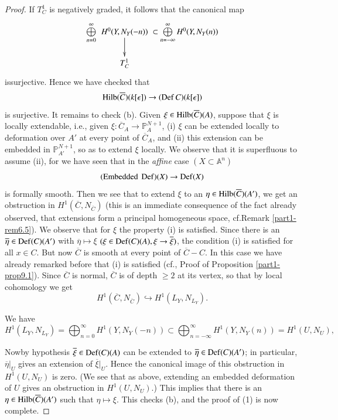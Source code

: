 {\begin{proof}
If $T^{1}_{C}$ is negatively graded, it follows that the canonical map
\[
\xymatrix@C=.0cm@R=.5cm{
\bigoplus\limits^{\infty}_{n=0} & H^{0}(Y,N_{Y}(-n))\ar[d] & \subset
\bigoplus\limits^{\infty}_{n=-\infty}H^{0}(Y,N_{Y}(n))\\
& T^{1}_{C} &
}
\]
is\pageoriginale surjective. Hence we have checked that
$$
\operatorname{Hilb}(\overline{C})(k[\epsilon])\to (\operatorname{Def} C)(k[\epsilon])
$$
is surjective. It remains to check (b). Given $\xi\in
\operatorname{Hilb}(\overline{C})(A)$, suppose that $\xi$ is locally extendable,
i.e., given $\xi:\overline{C}_{A}\to \mathbb{P}^{N+1}_{A}$, (i) $\xi$
can be extended locally to deformation over $A'$ at every point of
$\overline{C}_{A}$, and (ii) this extension can be embedded in
$\mathbb{P}^{N+1}_{A'}$, so as to extend $\xi$ locally. We observe
that it is superfluous to assume (ii), for we have seen that in the
{\em affine} case $(X\subset \mathbb{A}^{n})$
$$
(\text{Embedded~}\operatorname{Def})(X)\to \operatorname{Def}(X)
$$
is formally smooth. Then we see that to extend $\xi$ to an $\eta\in
\operatorname{Hilb}(\overline{C})(A')$, we get an obstruction in
$H^{1}(\overline{C},N_{\overline{C}})$ (this is an immediate
consequence of the fact already observed, that extensions form a
principal homogeneous space, cf.\@ Remark \ref{part1-rem6.5}). We
observe that for $\xi$ the property (i) is satisfied. Since there is
an $\overline{\eta}\in\operatorname{Def}(C)(A')$ with $\overline{\eta}\mapsto \xi$
$(\xi\in \operatorname{Def}(C)(A),\xi\to\overline{\xi})$, the condition (i) is
satisfied for all $x\in C$. But now $\overline{C}$ is smooth at every
point of $\overline{C}-C$. In this case we have already remarked
before that (i) is satisfied (cf., Proof of Proposition
\ref{part1-prop9.1}). Since $\overline{C}$ is normal, $\overline{C}$
is of depth $\geq 2$ at its vertex, so that by local cohomology we get
$$
H^{1}(\overline{C},N_{\overline{C}})\hookrightarrow
H^{1}(L_{Y},N_{L_{Y}}).
$$

We have
$$
H^{1}(L_{Y},N_{L_{Y}})=\bigoplus^{\infty}_{n=0}H^{1}(Y,N_{Y}(-n))\subset
\bigoplus^{\infty}_{n=-\infty}H^{1}(Y,N_{Y}(n))=H^{1}(U,N_{U}), 
$$

Now\pageoriginale by hypothesis $\overline{\xi}\in \operatorname{Def}(C)(A)$ can be
extended to $\overline{\eta}\in \Def(C)\break(A')$; in particular,
$\overline{\eta}|_{U}$ gives an extension of
$\overline{\xi}|_{U}$. Hence the canonical image of this obstruction
in $H^{1}(U,N_{U})$ is zero. (We see that as above, extending an
embedded deformation of $U$ gives an obstruction in $H^{1}(U,N_{U})$.)
This implies that there is an $\eta\in \operatorname{Hilb}(\overline{C})(A')$ such
that $\eta\mapsto \xi$. This checks (b), and the proof of (1) is now
complete. 


\end{proof}}
